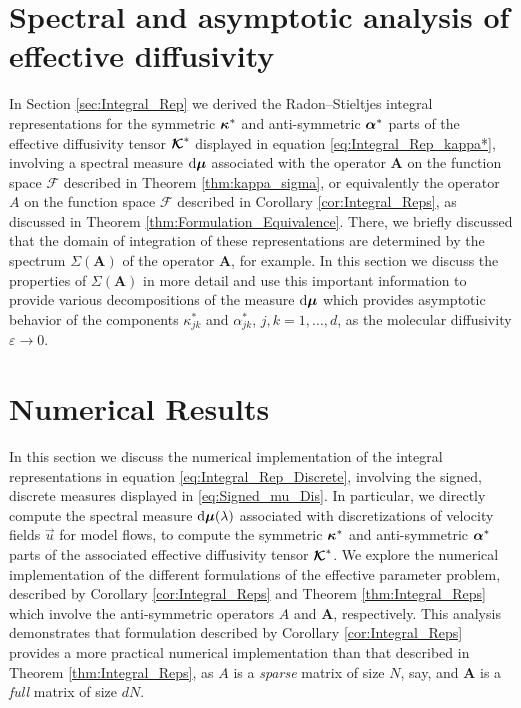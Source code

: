 \documentclass[11pt]{amsart}
\renewcommand{\d}{\mathrm{d}}
\newcommand{\Ab}{\mathbf{A}}
\newcommand\Kbc{\mbox{\boldmath${\mathcal{K}}$}}
\newcommand{\Fc}{\mathcal{F}}
\newcommand{\Fs}{\mathscr{F}}
\newcommand\bmu{\mbox{\boldmath${\mu}$}}
\newcommand\balpha{\mbox{\boldmath${\alpha}$}}
\newcommand\bkappa{\mbox{\boldmath${\kappa}$}}
\begin{document}
\section{Spectral and asymptotic analysis of effective
  diffusivity} \label{sec:Assymptotics}
%
In Section \ref{sec:Integral_Rep} we derived the Radon--Stieltjes
integral representations for the symmetric $\bkappa^*$ and
anti-symmetric $\balpha^*$ parts of the effective diffusivity tensor
$\Kbc^*$ displayed in equation \eqref{eq:Integral_Rep_kappa*},
involving a spectral measure $\d\bmu$ associated with the operator
$\Ab$ on the function space $\Fs$ described in Theorem
\ref{thm:kappa_sigma}, or equivalently the operator $A$ on the
function space $\Fc$ described in Corollary
\ref{cor:Integral_Reps}, as discussed in Theorem
\ref{thm:Formulation_Equivalence}. There, we briefly discussed that
the domain of integration of these representations are determined by
the spectrum $\Sigma(\Ab)$ of the operator $\Ab$, for example. In this
section we discuss the properties of $\Sigma(\Ab)$ in more detail and use
this important information to provide various decompositions of the
measure $\d\bmu$ which provides asymptotic behavior of the components 
$\kappa^*_{jk}$ and $\alpha^*_{jk}$, $j,k=1,\ldots,d$, as the molecular diffusivity
$\varepsilon\to0$. 




\section{Numerical Results}\label{sec:Num_Results}
%
In this section we discuss the numerical implementation of the
integral representations in equation \eqref{eq:Integral_Rep_Discrete},
involving the signed, discrete measures displayed in
\eqref{eq:Signed_mu_Dis}. In particular, we directly compute the
spectral measure $\d\bmu(\lambda)$ associated with discretizations of
velocity fields $\vec{u}$ for model flows, to compute the symmetric
$\bkappa^*$ and anti-symmetric $\balpha^*$ parts of the associated
effective diffusivity tensor $\Kbc^*$. We explore the numerical
implementation of the different formulations of the effective
parameter problem, described by Corollary \ref{cor:Integral_Reps} and
Theorem \ref{thm:Integral_Reps} which involve the anti-symmetric
operators $A$ and $\Ab$, respectively. This analysis demonstrates that
formulation described by Corollary \ref{cor:Integral_Reps} provides a
more practical numerical implementation than that described in Theorem
\ref{thm:Integral_Reps}, as $A$ is a \emph{sparse} matrix of size $N$,
say, and $\Ab$ is a \emph{full} matrix of size $dN$.    
\end{document}
